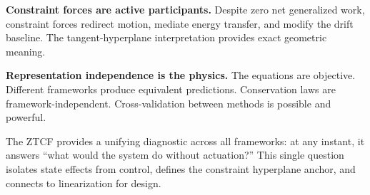 \documentclass[11pt]{article}
\begin{document}
\textbf{Constraint forces are active participants.}
Despite zero net generalized work, constraint forces redirect motion, mediate energy transfer, and modify the drift baseline.
The tangent-hyperplane interpretation provides exact geometric meaning.

\textbf{Representation independence is the physics.}
The equations are objective.
Different frameworks produce equivalent predictions.
Conservation laws are framework-independent.
Cross-validation between methods is possible and powerful.

The ZTCF provides a unifying diagnostic across all frameworks: at any instant, it answers ``what would the system do without actuation?''
This single question isolates state effects from control, defines the constraint hyperplane anchor, and connects to linearization for design.
\end{document}

